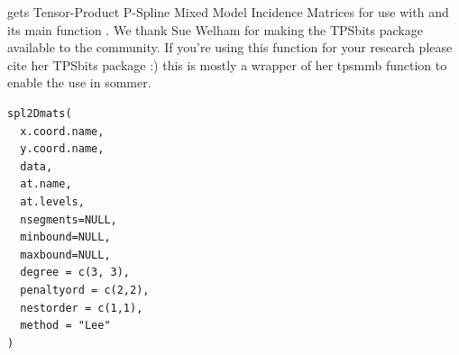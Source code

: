 \documentclass[a4paper]{book}
\begin{document}
%
\begin{Description}\relax
{} gets Tensor-Product P-Spline Mixed Model Incidence Matrices
for use with  and its main function . We thank Sue Welham for making the TPSbits package available to the community. If you're using this function for your research please cite her TPSbits package :) this is mostly a wrapper of her tpsmmb function to enable the use in sommer.
\end{Description}
%
\begin{Usage}
\begin{verbatim}
spl2Dmats(
  x.coord.name,
  y.coord.name,
  data,
  at.name,
  at.levels, 
  nsegments=NULL,
  minbound=NULL,
  maxbound=NULL,
  degree = c(3, 3),
  penaltyord = c(2,2), 
  nestorder = c(1,1),
  method = "Lee"
)
\end{verbatim}
\end{Usage}
%
\end{document}
